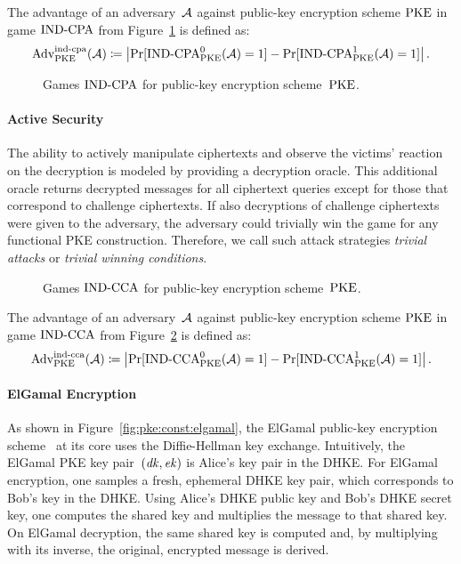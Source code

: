 The advantage of an adversary~$\mathcal{A}$ against public-key encryption scheme $\mathrm{PKE}$ in game ${\mathrm{IND}\text{-}\mathrm{CPA}}$ from Figure~\ref{fig:pke:ind:cpa} is defined as:
\[
\mathrm{Adv}_{\mathrm{PKE}}^{\mathrm{ind}\text{-}\mathrm{cpa}}(\mathcal{A})\coloneqq\left|\Pr[{\mathrm{IND}\text{-}\mathrm{CPA}}_{\mathrm{PKE}}^0(\mathcal{A})=1]-\Pr[{\mathrm{IND}\text{-}\mathrm{CPA}}_{\mathrm{PKE}}^1(\mathcal{A})=1]\right|\text{.}
\]

\begin{figure}[!ht]
    \centering
    \nicoresetlinenr%
    \fbox{%
        \scalebox{\codescalefactor}{%
        }%
    }
    \caption{%
        Games ${\mathrm{IND}\text{-}\mathrm{CPA}}$ for public-key encryption scheme~$\mathrm{PKE}$.
    }
    \label{fig:pke:ind:cpa}
\end{figure}

\paragraph{Active Security}
The ability to actively manipulate ciphertexts and observe the victims' reaction on the decryption is modeled by providing a decryption oracle.
This additional oracle returns decrypted messages for all ciphertext queries except for those that correspond to challenge ciphertexts.
If also decryptions of challenge ciphertexts were given to the adversary, the adversary could trivially win the game for any functional PKE construction.
Therefore, we call such attack strategies \emph{trivial attacks} or \emph{trivial winning conditions}.

\begin{figure}[!ht]
    \centering
    \nicoresetlinenr%
    \fbox{%
        \scalebox{\codescalefactor}{%
        }%
    }
    \caption{%
        Games ${\mathrm{IND}\text{-}\mathrm{CCA}}$ for public-key encryption scheme~$\mathrm{PKE}$.
    }
    \label{fig:pke:ind}
\end{figure}

The advantage of an adversary~$\mathcal{A}$ against public-key encryption scheme $\mathrm{PKE}$ in game ${\mathrm{IND}\text{-}\mathrm{CCA}}$ from Figure~\ref{fig:pke:ind} is defined as:
\[
\mathrm{Adv}_{\mathrm{PKE}}^{\mathrm{ind}\text{-}\mathrm{cca}}(\mathcal{A})\coloneqq\left|\Pr[{\mathrm{IND}\text{-}\mathrm{CCA}}_{\mathrm{PKE}}^0(\mathcal{A})=1]-\Pr[{\mathrm{IND}\text{-}\mathrm{CCA}}_{\mathrm{PKE}}^1(\mathcal{A})=1]\right|\text{.}
\]

\paragraph{ElGamal Encryption}
As shown in Figure~\ref{fig:pke:const:elgamal}, the ElGamal public-key encryption scheme~\cite{ElGamal85} at its core uses the Diffie-Hellman key exchange.
Intuitively, the ElGamal PKE key pair~$(\mathit{dk},\mathit{ek})$ is Alice's key pair in the DHKE.
For ElGamal encryption, one samples a fresh, ephemeral DHKE key pair, which corresponds to Bob's key in the DHKE.
Using Alice's DHKE public key and Bob's DHKE secret key, one computes the shared key and multiplies the message to that shared key.
On ElGamal decryption, the same shared key is computed and, by multiplying with its inverse, the original, encrypted message is derived.

